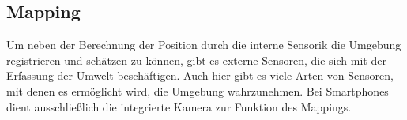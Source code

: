 \subsection{Mapping}
Um neben der Berechnung der Position durch die interne Sensorik die Umgebung registrieren und schätzen zu können, gibt es externe Sensoren, 
die sich mit der Erfassung der Umwelt beschäftigen. Auch hier gibt es viele Arten von Sensoren, mit denen es ermöglicht wird, die Umgebung 
wahrzunehmen. Bei Smartphones dient ausschließlich die integrierte Kamera zur Funktion des Mappings. \cite{SLAMMapping.2018}


